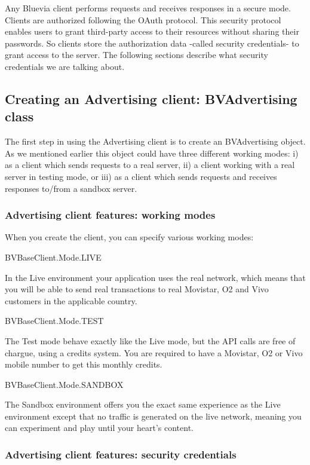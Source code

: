 Any Bluevia client performs requests and receives responses in a secure mode. Clients are authorized following the OAuth protocol. This security protocol enables users to grant third-\/party access to their resources without sharing their passwords. So clients store the authorization data -\/called security credentials-\/ to grant access to the server. The following sections describe what security credentials we are talking about.\hypertarget{blv_ad_guide_creating_ad_client_sec}{}\subsection{Creating an Advertising client: BVAdvertising class}\label{blv_ad_guide_creating_ad_client_sec}
The first step in using the Advertising client is to create an BVAdvertising object. As we mentioned earlier this object could have three different working modes: i) as a client which sends requests to a real server, ii) a client working with a real server in testing mode, or iii) as a client which sends requests and receives responses to/from a sandbox server.\hypertarget{blv_ad_guide_adclient_features_working_modes_sec}{}\subsubsection{Advertising client features: working modes}\label{blv_ad_guide_adclient_features_working_modes_sec}
When you create the client, you can specify various working modes: 
\begin{DoxyItemize}
\item BVBaseClient.Mode.LIVE \par
In the Live environment your application uses the real network, which means that you will be able to send real transactions to real Movistar, O2 and Vivo customers in the applicable country.


\item BVBaseClient.Mode.TEST \par
The Test mode behave exactly like the Live mode, but the API calls are free of chargue, using a credits system. You are required to have a Movistar, O2 or Vivo mobile number to get this monthly credits.


\item BVBaseClient.Mode.SANDBOX \par
The Sandbox environment offers you the exact same experience as the Live environment except that no traffic is generated on the live network, meaning you can experiment and play until your heart’s content. 
\end{DoxyItemize}\hypertarget{blv_ad_guide_adclient_features_security_credentials}{}\subsubsection{Advertising client features: security credentials}\label{blv_ad_guide_adclient_features_security_credentials}
